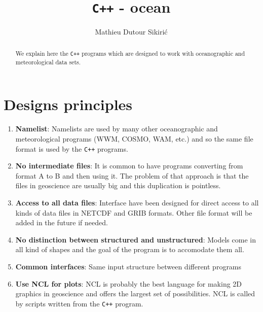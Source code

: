 \documentclass[12pt]{amsart}
\begin{document}
\author{Mathieu Dutour Sikiri\'c}
\address{Mathieu Dutour Sikiri\'c, Rudjer Boskovi\'c Institute, Bijenicka 54, 10000 Zagreb, Croatia, Fax: +385-1-468-0245}







\title{{\tt C++} - ocean}


\maketitle

\begin{abstract}
We explain here the {\tt C++} programs which are designed to work with oceanographic and meteorological data sets.
\end{abstract}

\section{Designs principles}

\begin{enumerate}
\item {\bf Namelist}: Namelists are used by many other oceanographic and meteorological programs (WWM, COSMO, WAM, etc.) and so the same file format is used by the {\tt C++} programs.
\item {\bf No intermediate files}: It is common to have programs converting from format A to B and then using it. The problem of that approach is that the files in geoscience are usually big and this duplication is pointless.
\item {\bf Access to all data files}: Interface have been designed for direct access to all kinds of data files in NETCDF and GRIB formats. Other file format will be added in the future if needed.
\item {\bf No distinction between structured and unstructured}: Models come in all kind of shapes and the goal of the program is to accomodate them all.
\item {\bf Common interfaces}: Same input structure between different programs
\item {\bf Use NCL for plots}: NCL is probably the best language for making 2D graphics in geoscience and offers the largest set of possibilities. NCL is called by scripts written from the {\tt C++} program.
\end{enumerate}
\end{document}
